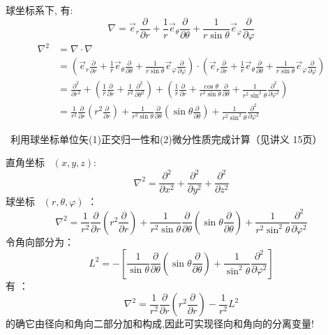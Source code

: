 	球坐标系下, 有:
	\begin{equation*}
	\nabla=\vec{e}_{r} \frac{\partial}{\partial r}+\frac{1}{r} \vec{e}_{\theta} \frac{\partial}{\partial \theta}+\frac{1}{r \sin \theta} \vec{e}_{\varphi} \frac{\partial}{\partial \varphi}
	\end{equation*}
	\begin{equation*}
	\begin{split}
		\nabla ^2&=\nabla \cdot \nabla \\
		&=(\vec{e}_{r} \frac{\partial}{\partial r}+\frac{1}{r} \vec{e}_{\theta} \frac{\partial}{\partial \theta}+\frac{1}{r \sin \theta} \vec{e}_{\varphi} \frac{\partial}{\partial \varphi})  \cdot (\vec{e}_{r} \frac{\partial}{\partial r}+\frac{1}{r} \vec{e}_{\theta} \frac{\partial}{\partial \theta}+\frac{1}{r \sin \theta} \vec{e}_{\varphi} \frac{\partial}{\partial \varphi}) \\
		&=\frac{\partial ^2}{\partial r^2} + ( \frac{1}{r} \frac{\partial}{\partial r} + \frac{1}{r^2} \frac{\partial^2} {\partial \theta ^2}  ) + (\frac{1}{r} \frac{\partial}{\partial r}  + \frac{\cos \theta}{r^2 \sin \theta} \frac{\partial} {\partial \theta }  + \frac{1}{r^2 \sin^2 \theta  } \frac{\partial^2}{\partial\varphi ^2} )\\
		&=\frac{1}{r^2} \frac{\partial }{\partial r} (r^2\frac{\partial }{\partial r} )+
		\frac{1}{r^2 \sin \theta  } \frac{\partial }{\partial \theta } (\sin \theta \frac{\partial }{\partial \theta } )
		+\frac{1}{r^2 \sin^2 \theta  } \frac{\partial^2}{\partial\varphi ^2}
	\end{split}
	\end{equation*}

	{\Bullet}~利用球坐标单位矢(1)正交归一性和(2)微分性质完成计算（见讲义 15页）
	


	直角坐标~ $(x,y,z) $: 
	\begin{equation*}
		\nabla ^{2}  = \dfrac{\partial ^2}{\partial x^2} +\dfrac{\partial^2 }{\partial y^2} +\dfrac{\partial^2  }{\partial z^2}
	\end{equation*}
	球坐标~ $(r,\theta, \varphi )$ ：
	\begin{equation*}
		\nabla ^{2} =\frac{1}{r^2} \frac{\partial }{\partial r} (r^2\frac{\partial }{\partial r} )+
		\frac{1}{r^2 \sin \theta  } \frac{\partial }{\partial \theta } (\sin \theta \frac{\partial }{\partial \theta } )
		+\frac{1}{r^2 \sin^2 \theta  } \frac{\partial^2}{\partial\varphi ^2}
	\end{equation*}	
	令角向部分为：
	\begin{equation*}
		L^2 = - \left[ \frac{1}{ \sin \theta  } \frac{\partial }{\partial \theta } (\sin \theta \frac{\partial }{\partial \theta } )
		+\frac{1}{ \sin^2 \theta  } \frac{\partial^2}{\partial\varphi ^2} \right]
	\end{equation*}	
	有 ：
	\begin{equation*}
		\nabla ^{2} =\frac{1}{r^2} \frac{\partial }{\partial r} (r^2\frac{\partial }{\partial r} )-
		\frac{1}{r^2 } L^2 
	\end{equation*}	
	的确它由径向和角向二部分加和构成,因此可实现径向和角向的分离变量!
	


